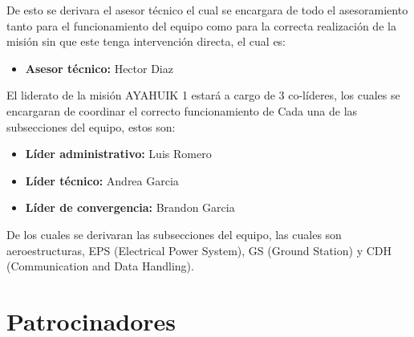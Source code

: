 \documentclass[letterpaper,12pt]{article} %
\begin{document}
    De esto se derivara el asesor técnico el cual se encargara de todo el asesoramiento tanto para el funcionamiento del equipo
    como para la correcta realización de la misión sin que este tenga intervención directa, el cual es:

    \begin{itemize}
        \item \textbf{Asesor técnico:} Hector Diaz

    \end{itemize}

    El liderato de la misión AYAHUIK 1 estará a cargo de 3 co-líderes,
    los cuales se encargaran de coordinar el correcto funcionamiento de Cada
    una de las subsecciones del equipo, estos son:

    \begin{itemize}
        \item \textbf{Líder administrativo:} Luis Romero
        \item \textbf{Líder técnico:} Andrea Garcia
        \item \textbf{Líder de convergencia:} Brandon Garcia
    
    \end{itemize}

    De los cuales se derivaran las subsecciones del equipo, las cuales son aeroestructuras, EPS (Electrical Power System), GS (Ground Station) y CDH (Communication and Data Handling).

    \newpage
    \section{Patrocinadores}
    \captionsetup[subfigure]{labelformat=empty}
\end{document}
